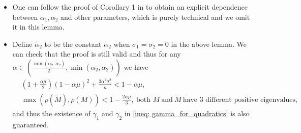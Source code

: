 \documentclass{article}
\theoremstyle{plain}
\theoremstyle{definition}
\theoremstyle{remark}
\begin{document}
\begin{itemize}
    \item One can follow the proof of Corollary 1 in \citet{pu2021distributed} to obtain an explicit dependence between $\alpha_1, \alpha_2$ and other parameters, which is purely technical and we omit it in this lemma.
    
    \item Define $\tilde{\alpha}_2$ to be the constant $\alpha_2$ when $\sigma_1 = \sigma_2 = 0$ in the above lemma. We can check that the proof is still valid and thus for any $\alpha\in (\frac{\min\left(\alpha_2, \tilde{\alpha}_2\right)}{2}, \min\left(\alpha_2, \tilde{\alpha}_2\right) )$ we have
    \begin{align*}
        &\left(1+\frac{\alpha\mu}{2}\right)(1-\alpha\mu)^2 + \frac{3\alpha^2\sigma_1^2}{n}<1-\alpha\mu,\\
        &\max\left(\rho(\tilde{M}), \rho(M)\right) < 1 - \frac{2\alpha\mu}{3},\ \text{both } M~\text{and}~ \tilde{M}~\text{have 3 different positive eigenvalues}, 
    \end{align*}
    and thus the existence of $\gamma_1$ and $\gamma_2$ in \eqref{ineq: gamma_for_quadratics} is also guaranteed.
\end{itemize}
\end{document}
